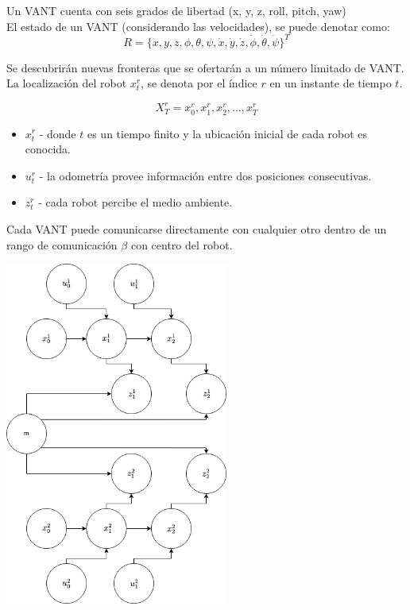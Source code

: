 \documentclass[12pt]{article}
\begin{document}
\newpage

Un VANT cuenta con seis grados de libertad (x, y, z, roll, pitch, yaw) \\

El estado de un VANT (considerando las velocidades), se puede denotar como:\\
\[
R = \{x, y, z, \phi, \theta, \psi, \dot{x}, \dot{y}, \dot{z}, \dot{\phi}, \dot{\theta}, \dot{\psi}\}^T
\]

Se descubrirán nuevas fronteras que se ofertarán a un número limitado de VANT.\\

La localización del robot $x_{t}^{r}$, se denota por el índice $r$ en un instante de tiempo $t$.

\[
X_{T}^{r} = {x_{0}^{r},x_{1}^{r},x_{2}^{r},...,x_{T}^{r}}
\]

\begin{itemize}
\item $x_{t}^{r}$ - donde $t$ es un tiempo finito y la ubicación inicial de cada robot es conocida.
\item $u_{t}^{r}$ - la odometría provee información entre dos posiciones consecutivas.
\item $z_{t}^{r}$ - cada robot percibe el medio ambiente.
\end{itemize}

Cada VANT puede comunicarse directamente con cualquier otro dentro de un rango de comunicación $\beta$ con centro del robot.\\

\begin{center}
\includegraphics[width=0.55\textwidth]{diagrama}
\end{center}
\end{document}
